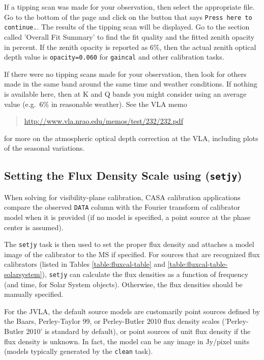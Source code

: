 If a tipping scan was made for your observation, then select the
appropriate file.  Go to the bottom of the page and click on the
button that says {\tt Press here to continue.}.  The results of the
tipping scan will be displayed.  Go to the section called 'Overall Fit
Summary' to find the fit quality and the fitted zenith opacity in
percent.  If the zenith opacity is reported as 6\%, then the actual
zenith optical depth value is {\tt opacity=0.060} for {\tt gaincal}
and other calibration tasks.

If there were no tipping scans made for your observation, then look
for others made in the same band around the same time and weather
conditions.  If nothing is available here, then at K and Q bands
you might consider using an average value (e.g.\ 6\% in reasonable
weather).  See the VLA memo
\begin{quote}
   \url{http://www.vla.nrao.edu/memos/test/232/232.pdf}
\end{quote}
for more on the atmospheric optical depth correction at the VLA,
including plots of the seasonal variations.

\subsection{Setting the Flux Density Scale using ({\tt setjy})}
\label{section:cal.prior.models}

When solving for visibility-plane calibration, CASA calibration
applications compare the observed {\tt DATA} column with the Fourier
transform of calibrator model when it is provided (if no model is
specified, a point source at the phase center is assumed).  

The {\tt setjy} task is then used to set the proper flux density and
attaches a model image of the calibrator to the MS if specified. For
sources that are recognized flux calibrators (listed in Tables
\ref{table:fluxcal-table} and \ref{table:fluxcal-table-solarsystem}),
{\tt setjy} can calculate the flux densities as a function of
frequency (and time, for Solar System objects).  Otherwise, the flux
densities should be manually specified.  

For the JVLA, the default source models are customarily point sources
defined by the Baars, Perley-Taylor 99, or Perley-Butler 2010 flux density
scales ('Perley-Butler 2010' is standard by default),
or point sources of unit flux density if the flux density is
unknown. In fact, the model can be any image in Jy/pixel units (models
typically generated by the {\tt clean} task).

